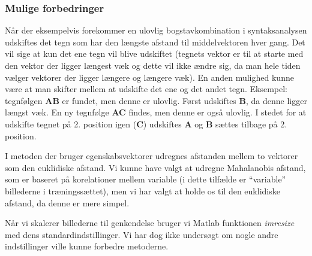 \subsubsection{Mulige forbedringer}
Når der eksempelvis forekommer en ulovlig bogstavkombination i syntaksanalysen udskiftes det tegn som har den længste afstand til middelvektoren hver gang. Det vil sige at kun det ene tegn vil blive udskiftet (tegnets vektor er til at starte med den vektor der ligger længest væk og dette vil ikke ændre sig, da man hele tiden vælger vektorer der ligger længere og længere væk). En anden mulighed kunne være at man skifter mellem at udskifte det ene og det andet tegn. Eksempel: tegnfølgen \textbf{AB} er fundet, men denne er ulovlig. Først udskiftes \textbf{B}, da denne ligger længst væk. En ny tegnfølge \textbf{AC} findes, men denne er også ulovlig. I stedet for at udskifte tegnet på 2. position igen (\textbf{C}) udskiftes \textbf{A} og \textbf{B} sættes tilbage på 2. position.

I metoden der bruger egenskabsvektorer udregnes afstanden mellem to vektorer som den euklidiske afstand. Vi kunne have valgt at udregne Mahalanobis afstand, som er baseret på korelationer mellem variable (i dette tilfælde er ``variable'' billederne i træningssættet), men vi har valgt at holde os til den euklidiske afstand, da denne er mere simpel.

Når vi skalerer billederne til genkendelse bruger vi Matlab funktionen \textit{imresize} med dens standardindstillinger. Vi har dog ikke undersøgt om nogle andre indstillinger ville kunne forbedre metoderne.